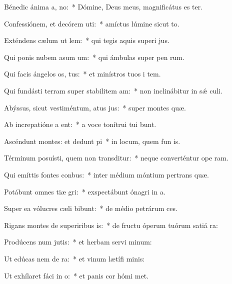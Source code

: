 \item Bénedic ánima a, no:~* Dómine, Deus meus, magnificátus es ter.
\item Confessiónem, et decórem uti:~* amíctus lúmine sicut to.
\item Exténdens cælum ut lem:~* qui tegis aquis superi jus.
\item Qui ponis nubem asum um:~* qui ámbulas super pen rum.
\item Qui facis ángelos os, tus:~* et minístros tuos i tem.
\item Qui fundásti terram super stabilitem am:~* non inclinábitur in sǽ culi.
\item Abýssus, sicut vestiméntum, atus jus:~* super montes  quæ.
\item Ab increpatióne a ent:~* a voce tonítrui tui bunt.
\item Ascéndunt montes: et dedunt pi~* in locum, quem fun is.
\item Términum posuísti, quem non transditur:~* neque converténtur ope ram.
\item Qui emíttis fontes  conbus:~* inter médium móntium pertrans quæ.
\item Potábunt omnes tiæ gri:~* exspectábunt ónagri in  a.
\item Super ea vólucres cæli bibunt:~* de médio petrárum  ces.
\item Rigans montes de superiribus is:~* de fructu óperum tuórum satiá ra:
\item Prodúcens num jutis:~* et herbam servi minum:
\item Ut edúcas nem de ra:~* et vinum lætífi  minis:
\item Ut exhílaret fáci in o:~* et panis cor hómi met.
